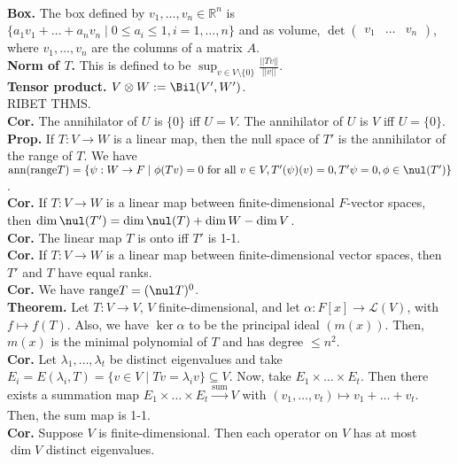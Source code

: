 	\\ \textbf{Box. } The box defined by $v_1,\dots,v_n \in \mathbb{R}^n$ is $\{a_1v_1 + \dots + a_nv_n \mid 0 \leq a_i \leq 1, i =1,\dots,n\}$ and as volume, $\det \begin{pmatrix} v_1 & \dots & v_n \end{pmatrix}$, where $v_1,\dots,v_n$ are the columns of a matrix $A$. 
	\\ \textbf{Norm of $T$. } This is defined to be $\sup_{v \in V \setminus \{0\}} \frac{||Tv||}{||v||}$. 
	\\ \textbf{Tensor product. } $V \otimes W := \Bil(V',W')$. 
	\\ RIBET THMS. 
	\\ \textbf{Cor. } The annihilator of $U$ is $\{0\}$ iff $U = V$. The annihilator of $U$ is $V$ iff $U = \{0\}$. 
	\\ \textbf{Prop. } If $T: V \to W$ is a linear map, then the null space of $T'$ is the annihilator of the range of $T$. We have $\textrm{ann}(\textrm{range}T) = \{\psi: W \to F \mid \phi(Tv)=0 \textrm{ for all } v \in V, T'(\psi)(v)=0, T'\psi = 0, \phi \in \nul(T')\}$. 
	\\ \textbf{Cor. } If $T: V \to W$ is a linear map between finite-dimensional $F$-vector spaces, then $\dim \nul(T') = \dim \nul(T) + \dim W - \dim V$. 
	\\ \textbf{Cor. } The linear map $T$ is onto iff $T'$ is 1-1. 
	\\ \textbf{Cor. } If $T: V \to W$ is a linear map between finite-dimensional vector spaces, then $T'$ and $T$ have equal ranks. 
	\\ \textbf{Cor. } We have $\textrm{range}T = (\nul T)^0$. 
	\\ \textbf{Theorem. } Let $T: V \to V$, $V$ finite-dimensional, and let $\alpha: F[x] \to \mathscr{L}(V)$, with $f \mapsto f(T)$. Also, we have $\ker\alpha$ to be the principal ideal $(m(x))$. Then, $m(x)$ is the minimal polynomial of $T$ and has degree $\leq n^2$. 
	\\ \textbf{Cor. } Let $\lambda_1,\dots,\lambda_t$ be distinct eigenvalues and take $E_i = E(\lambda_i,T) = \{v \in V \mid Tv = \lambda_iv\} \subseteq V$. Now, take $E_1 \times \dots \times E_t$. Then there exists a summation map $E_1 \times \dots \times E_t \xrightarrow[]{\textrm{sum}} V$ with $(v_1,\dots,v_t) \mapsto v_1 + \dots + v_t$. Then, the sum map is 1-1. 
	\\ \textbf{Cor. } Suppose $V$ is finite-dimensional. Then each operator on $V$ has at most $\dim V$ distinct eigenvalues. 
